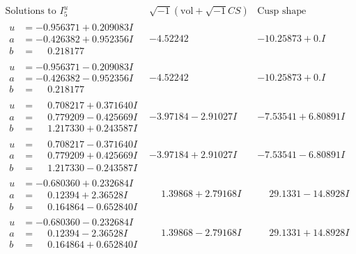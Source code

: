 \documentclass[1p]{elsarticle_modified}
\theoremstyle{definition}
\newcommand{\I}{\sqrt{-1}}
\begin{document}
$$\begin{array}{c|c|c}  
\text{Solutions to }I^u_{5}& \I (\text{vol} + \sqrt{-1}CS) & \text{Cusp shape}\\
 \hline 
\begin{aligned}
u &= -0.956371 + 0.209083 I \\
a &= -0.426382 + 0.952356 I \\
b &= \phantom{-}0.218177\phantom{ +0.000000I}\end{aligned}
 & -4.52242\phantom{ +0.000000I} & -10.25873 + 0. I\phantom{ +0.000000I} \\ \hline\begin{aligned}
u &= -0.956371 - 0.209083 I \\
a &= -0.426382 - 0.952356 I \\
b &= \phantom{-}0.218177\phantom{ +0.000000I}\end{aligned}
 & -4.52242\phantom{ +0.000000I} & -10.25873 + 0. I\phantom{ +0.000000I} \\ \hline\begin{aligned}
u &= \phantom{-}0.708217 + 0.371640 I \\
a &= \phantom{-}0.779209 - 0.425669 I \\
b &= \phantom{-}1.217330 + 0.243587 I\end{aligned}
 & -3.97184 - 2.91027 I & -7.53541 + 6.80891 I \\ \hline\begin{aligned}
u &= \phantom{-}0.708217 - 0.371640 I \\
a &= \phantom{-}0.779209 + 0.425669 I \\
b &= \phantom{-}1.217330 - 0.243587 I\end{aligned}
 & -3.97184 + 2.91027 I & -7.53541 - 6.80891 I \\ \hline\begin{aligned}
u &= -0.680360 + 0.232684 I \\
a &= \phantom{-}0.12394 + 2.36528 I \\
b &= \phantom{-}0.164864 - 0.652840 I\end{aligned}
 & \phantom{-}1.39868 + 2.79168 I & \phantom{-}29.1331 - 14.8928 I \\ \hline\begin{aligned}
u &= -0.680360 - 0.232684 I \\
a &= \phantom{-}0.12394 - 2.36528 I \\
b &= \phantom{-}0.164864 + 0.652840 I\end{aligned}
 & \phantom{-}1.39868 - 2.79168 I & \phantom{-}29.1331 + 14.8928 I \\ \hline\begin{aligned}

\end{aligned}
\end{array}$$
\end{document}
